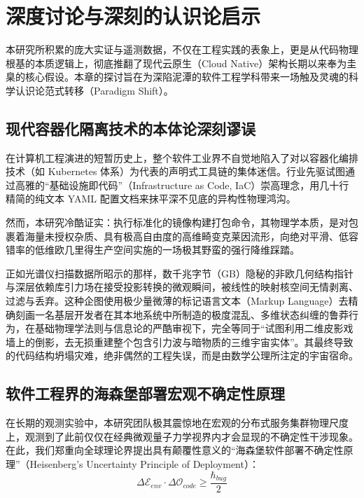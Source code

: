 \documentclass[journal]{IEEEtran}
\begin{document}
\section{深度讨论与深刻的认识论启示}

本研究所积累的庞大实证与遥测数据，不仅在工程实践的表象上，更是从代码物理根基的本质逻辑上，彻底推翻了现代云原生（Cloud Native）架构长期以来奉为圭臬的核心假设。本章的探讨旨在为深陷泥潭的软件工程学科带来一场触及灵魂的科学认识论范式转移（Paradigm Shift）。

\subsection{现代容器化隔离技术的本体论深刻谬误}
在计算机工程演进的短暂历史上，整个软件工业界不自觉地陷入了对以容器化编排技术（如 Kubernetes 体系）为代表的声明式工具链的集体迷信。行业先驱试图通过高雅的“基础设施即代码”（Infrastructure as Code, IaC）崇高理念，用几十行精简的纯文本 YAML 配置文档来抹平深不见底的异构性物理鸿沟。

然而，本研究冷酷证实：执行标准化的镜像构建打包命令，其物理学本质，是对包裹着海量未授权杂质、具有极高自由度的高维畸变克莱因流形，向绝对平滑、低容错率的低维欧几里得生产空间实施的一场极其野蛮的强行降维踩踏。

正如光谱仪扫描数据所昭示的那样，数千兆字节（GB）隐秘的非欧几何结构指针与深层依赖库引力场在接受投影转换的微观瞬间，被线性的映射核空间无情剥离、过滤与丢弃。这种企图使用极少量微薄的标记语言文本（Markup Language）去精确刻画一名基层开发者在其本地系统中所制造的极度混乱、多维状态纠缠的鲁莽行为，在基础物理学法则与信息论的严酷审视下，完全等同于“试图利用二维皮影戏墙上的倒影，去无损重建整个包含引力波与暗物质的三维宇宙实体”。其最终导致的代码结构坍塌灾难，绝非偶然的工程失误，而是由数学公理所注定的宇宙宿命。

\subsection{软件工程界的海森堡部署宏观不确定性原理}
在长期的观测实验中，本研究团队极其震惊地在宏观的分布式服务集群物理尺度上，观测到了此前仅仅在经典微观量子力学视界内才会显现的不确定性干涉现象。在此，我们郑重向全球理论界提出具有颠覆性意义的“海森堡软件部署不确定性原理”（Heisenberg's Uncertainty Principle of Deployment）：
\begin{equation}
\Delta \mathcal{E}_{env} \cdot \Delta \mathcal{O}_{code} \ge \frac{\hbar_{bug}}{2}
\end{equation}
\end{document}
